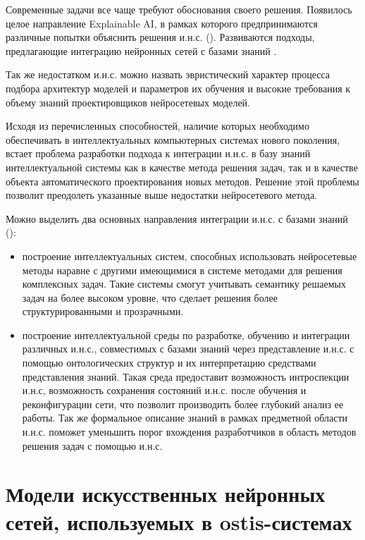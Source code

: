 Современные задачи все чаще требуют обоснования своего решения. Появилось целое направление Explainable AI, в рамках которого предпринимаются различные попытки объяснить решения и.н.с. (). Развиваются подходы, предлагающие интеграцию нейронных сетей с базами знаний .

Так же недостатком и.н.с. можно назвать эвристический характер процесса подбора архитектур моделей и параметров их обучения и высокие требования к объему знаний проектировщиков нейросетевых моделей.

Исходя из перечисленных способностей, наличие которых необходимо обеспечивать в интеллектуальных компьютерных системах нового поколения, встает проблема разработки подхода к интеграции и.н.с. в базу знаний интеллектуальной системы как в качестве метода решения задач, так и в качестве объекта автоматического проектирования новых методов. Решение этой проблемы позволит преодолеть указанные выше недостатки нейросетевого метода.

Можно выделить два основных направления интеграции и.н.с. с базами знаний ():
\begin{itemize}
	\item построение интеллектуальных систем, способных использовать нейросетевые методы наравне с другими имеющимися в системе методами для решения комплексных задач. Такие системы смогут учитывать семантику решаемых задач на более высоком уровне, что сделает решения более структурированными и прозрачными.
	\item построение интеллектуальной среды по разработке, обучению и интеграции различных и.н.с., совместимых с базами знаний через представление и.н.с. с помощью онтологических структур и их интерпретацию средствами представления знаний. Такая среда предоставит возможность интроспекции и.н.с, возможность сохранения состояний и.н.с. после обучения и реконфигурации сети, что позволит производить более глубокий анализ ее работы. Так же формальное описание знаний в рамках предметной области и.н.с. поможет уменьшить порог вхождения разработчиков в область методов решения задач с помощью и.н.с.
\end{itemize}


\section{Модели искусственных нейронных сетей, используемых в ostis-системах}
\label{sec_chapter_ann_models}

